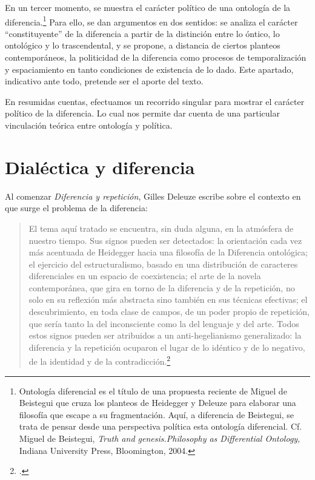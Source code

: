 \documentclass{book}
\begin{document}
En un tercer momento, se muestra el carácter político de una ontología
de la diferencia.\footnote{Ontología diferencial es el título de una
  propuesta reciente de Miguel de Beistegui que cruza los planteos de
  Heidegger y Deleuze para elaborar una filosofía que escape a su
  fragmentación. Aquí, a diferencia de Beistegui, se trata de pensar
  desde una perspectiva política esta ontología diferencial. Cf. Miguel
  de Beistegui, \emph{Truth and genesis.Philosophy as Differential
  Ontology,} Indiana University Press, Bloomington, 2004.} Para ello,
se dan argumentos en dos sentidos: se analiza el carácter
\enquote{constituyente} de la diferencia a partir de la distinción entre lo
óntico, lo ontológico y lo trascendental, y se propone, a distancia de
ciertos planteos contemporáneos, la politicidad de la diferencia como
procesos de temporalización y espaciamiento en tanto condiciones de
existencia de lo dado. Este apartado, indicativo ante todo, pretende ser
el aporte del texto.

En resumidas cuentas, efectuamos un recorrido singular para mostrar el
carácter político de la diferencia. Lo cual nos permite dar cuenta de
una particular vinculación teórica entre ontología y política.

\section{Dialéctica y diferencia}

Al comenzar \emph{Diferencia y repetición}, Gilles Deleuze escribe sobre
el contexto en que surge el problema de la diferencia:

\begin{quote}
El tema aquí tratado se encuentra, sin duda alguna, en la atmósfera de
nuestro tiempo. Sus signos pueden ser detectados: la orientación cada
vez más acentuada de Heidegger hacia una filosofía de la Diferencia
ontológica; el ejercicio del estructuralismo, basado en una distribución
de caracteres diferenciales en un espacio de coexistencia; el arte de la
novela contemporánea, que gira en torno de la diferencia y de la
repetición, no solo en su reflexión más abstracta sino también en sus
técnicas efectivas; el descubrimiento, en toda clase de campos, de un
poder propio de repetición, que sería tanto la del inconsciente como la
del lenguaje y del arte. Todos estos signos pueden ser atribuidos a un
anti-hegelianismo generalizado: la diferencia y la repetición ocuparon
el lugar de lo idéntico y de lo negativo, de la identidad y de la
contradicción.\footcite[15]{deleuze2002}
\end{quote}
\end{document}
